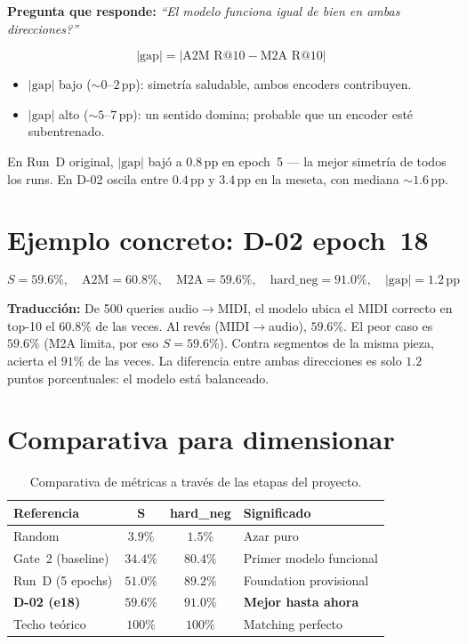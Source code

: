 \documentclass[11pt,a4paper]{article}
\newcommand{\pp}{\,\text{pp}}
\begin{document}
\textbf{Pregunta que responde:}
\emph{``\textquestiondown El modelo funciona igual de bien en ambas direcciones?''}

\[
  \boxed{\;|\text{gap}| = \big|\text{A2M R@10} - \text{M2A R@10}\big|\;}
\]

\begin{itemize}[nosep]
  \item $|\text{gap}|$ bajo (${\sim}0$--$2\pp$):
        simetr\'ia saludable, ambos encoders contribuyen.
  \item $|\text{gap}|$ alto (${\sim}5$--$7\pp$):
        un sentido domina; probable que un encoder est\'e subentrenado.
\end{itemize}

En Run~D original, $|\text{gap}|$ baj\'o a $0.8\pp$ en epoch~5
--- la mejor simetr\'ia de todos los runs.
En D-02 oscila entre $0.4\pp$ y $3.4\pp$ en la meseta,
con mediana ${\sim}1.6\pp$.

\section{Ejemplo concreto: D-02 epoch~18}

\[
  S = 59.6\%,\quad
  \text{A2M} = 60.8\%,\quad
  \text{M2A} = 59.6\%,\quad
  \text{hard\_neg} = 91.0\%,\quad
  |\text{gap}| = 1.2\pp
\]

\textbf{Traducci\'on:}
De 500 queries audio$\to$MIDI, el modelo ubica el MIDI correcto en top-10
el $60.8\%$ de las veces.
Al rev\'es (MIDI$\to$audio), $59.6\%$.
El peor caso es $59.6\%$ (M2A limita, por eso $S = 59.6\%$).
Contra segmentos de la misma pieza, acierta el $91\%$ de las veces.
La diferencia entre ambas direcciones es solo $1.2$ puntos porcentuales:
el modelo est\'a balanceado.

\section{Comparativa para dimensionar}

\begin{table}[h]
\centering
\begin{tabular}{@{}lccl@{}}
\toprule
\textbf{Referencia} & $\boldsymbol{S}$ & \textbf{hard\_neg} & \textbf{Significado} \\
\midrule
Random              & $3.9\%$   & $1.5\%$   & Azar puro \\
Gate~2 (baseline)   & $34.4\%$  & $80.4\%$  & Primer modelo funcional \\
Run~D (5 epochs)    & $51.0\%$  & $89.2\%$  & Foundation provisional \\
\textbf{D-02 (e18)} & $\boldsymbol{59.6\%}$ & $\boldsymbol{91.0\%}$ & \textbf{Mejor hasta ahora} \\
Techo te\'orico     & $100\%$   & $100\%$   & Matching perfecto \\
\bottomrule
\end{tabular}
\caption{Comparativa de m\'etricas a trav\'es de las etapas del proyecto.}
\label{tab:comparativa}
\end{table}
\end{document}
